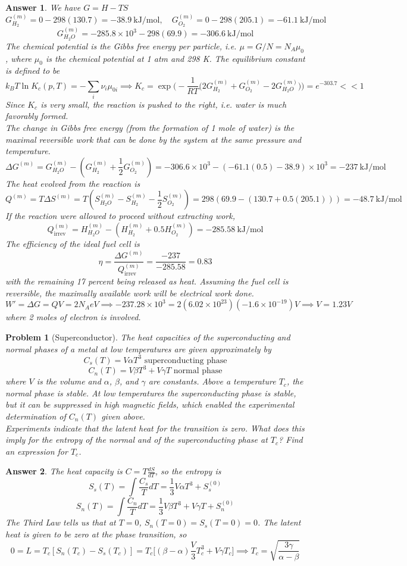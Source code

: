 \documentclass[a4paper]{article}
\theoremstyle{new2}
\newtheorem{ans}{Answer}[section]
\theoremstyle{new}
\newtheorem{qns}{Problem}[section]
\begin{document}
\begin{ans}
We have $G=H-TS$
$$G_{H_2}^{(m)}=0-298(130.7)=-38.9~\text{kJ/mol},\quad G_{O_2}^{(m)}=0-298(205.1)=-61.1~\text{kJ/mol}$$
$$G_{H_2O}^{(m)}=-285.8\times10^3-298(69.9)=-306.6~\text{kJ/mol}$$
The chemical potential is the Gibbs free energy per particle, i.e. $\mu=G/N=N_A\mu_0$, where $\mu_0$ is the chemical potential at 1 atm and 298 K. The equilibrium constant is defined to be
$$k_BT\ln K_c(p,T)=-\sum_i\nu_i\mu_{0i}\implies K_c=\exp\bigg(-\frac{1}{RT}\bigg(2G_{H_2}^{(m)}+G_{O_2}^{(m)}-2G_{H_2O}^{(m)}\bigg)\bigg)=e^{-303.7}<<1$$
Since $K_c$ is very small, the reaction is pushed to the right, i.e. water is much favorably formed.\\[5pt]
The change in Gibbs free energy (from the formation of 1 mole of water) is the maximal reversible work that can be done by the system at the same pressure and temperature. 
$$\Delta G^{(m)}=G^{(m)}_{H_2O}-(G_{H_2}^{(m)}+\frac{1}{2}G_{O_2}^{(m)})=-306.6\times10^3-(-61.1(0.5)-38.9)\times10^3=-237~\text{kJ/mol}$$
The heat evolved from the reaction is
$$Q^{(m)}=T\Delta S^{(m)}=T(S_{H_2O}^{(m)}-S_{H_2}^{(m)}-\frac{1}{2}S_{O_2}^{(m)})=298(69.9-(130.7+0.5(205.1)))=-48.7~\text{kJ/mol}$$
If the reaction were allowed to proceed without extracting work, 
$$Q_{\text{irrev}}^{(m)}=H_{H_2O}^{(m)}-(H_{H_2}^{(m)}+0.5H_{O_2}^{(m)})=-285.58~\text{kJ/mol}$$
The efficiency of the ideal fuel cell is
$$\eta=\frac{\Delta G^{(m)}}{Q_{\text{irrev}}^{(m)}}=\frac{-237}{-285.58}=0.83$$
with the remaining 17 percent being released as heat. Assuming the fuel cell is reversible, the maximally available work will be electrical work done.
$$W'=\Delta G=QV=2N_AeV\implies-237.28\times10^3=2(6.02\times10^{23})(-1.6\times10^{-19})V\implies V=1.23V$$
where 2 moles of electron is involved.
\end{ans}
\newpage
\begin{qns}[Superconductor]
The heat capacities of the superconducting and normal phases of a metal at low temperatures are given approximately by
$$C_s(T)=V\alpha T^3\text{ superconducting phase}$$
$$C_n(T)=V\beta T^3+V\gamma T\text{ normal phase}$$
where $V$ is the volume and $\alpha$, $\beta$, and $\gamma$ are constants. Above a temperature $T_c$, the normal phase is stable. At low temperatures the superconducting phase is stable, but it can be suppressed in high magnetic fields, which enabled the experimental determination of $C_n(T)$ given above.\\[5pt]
Experiments indicate that the latent heat for the transition is zero. What does this imply for the entropy of the normal and of the superconducting phase at $T_c$? Find an expression for $T_c$.
\end{qns}
\begin{ans}
The heat capacity is $C=T\frac{dS}{dT}$, so the entropy is
$$S_{s}(T)=\int\frac{C_{s}}{T}dT=\frac{1}{3}V\alpha T^3+S^{(0)}_{s}$$
$$S_{n}(T)=\int\frac{C_{n}}{T}dT=\frac{1}{3}V\beta T^3+V\gamma T+S^{(0)}_{n}$$
The Third Law tells us that at $T=0$, $S_n(T=0)=S_s(T=0)=0$. The latent heat is given to be zero at the phase transition, so
$$0=L=T_c[S_n(T_c)-S_s(T_c)]=T_c\bigg[(\beta-\alpha)\frac{V}{3}T_c^3+V\gamma T_c\bigg]\implies T_c=\sqrt{\frac{3\gamma}{\alpha-\beta}}$$
\end{ans}
\newpage
\end{document}
